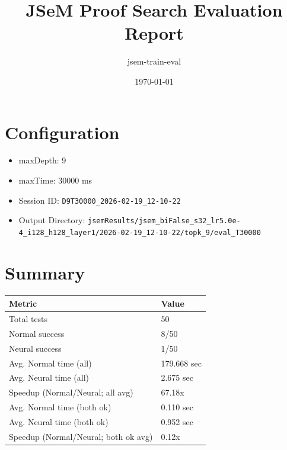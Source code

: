\documentclass[a4paper,10pt]{article}
\title{JSeM Proof Search Evaluation Report}
\author{jsem-train-eval}
\date{\today}
\begin{document}
\maketitle

\section{Configuration}
\begin{itemize}
\item maxDepth: 9
\item maxTime: 30000 ms
\item Session ID: \texttt{D9T30000\_2026-02-19\_12-10-22}
\item Output Directory: \texttt{jsemResults/jsem\_biFalse\_s32\_lr5.0e-4\_i128\_h128\_layer1/2026-02-19\_12-10-22/topk\_9/eval\_T30000}
\end{itemize}

\section{Summary}
\begin{tabular}{ll}
\toprule
\textbf{Metric} & \textbf{Value} \\
\midrule
Total tests & 50 \\
Normal success & 8/50 \\
Neural success & 1/50 \\
\midrule
Avg. Normal time (all) & 179.668 sec \\
Avg. Neural time (all) & 2.675 sec \\
Speedup (Normal/Neural; all avg) & 67.18x \\
Avg. Normal time (both ok) & 0.110 sec \\
Avg. Neural time (both ok) & 0.952 sec \\
Speedup (Normal/Neural; both ok avg) & 0.12x \\
\bottomrule
\end{tabular}
\end{document}
